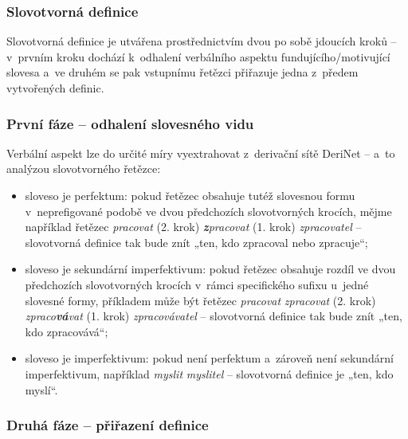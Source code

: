 \hypertarget{slovotvornuxe1-definice}{%
\subsubsection{Slovotvorná definice}\label{slovotvornuxe1-definice}}

Slovotvorná definice je utvářena prostřednictvím dvou po sobě jdoucích
kroků -- v~prvním kroku dochází k~odhalení verbálního aspektu
fundujícího/motivující slovesa a~ve druhém se pak vstupnímu řetězci
přiřazuje jedna z~předem vytvořených definic.

\hypertarget{prvni-faze}{%
\subsubsection*{První fáze -- odhalení slovesného vidu}\label{prvni-faze}}

Verbální aspekt lze do určité míry vyextrahovat z~derivační sítě DeriNet
-- a~to analýzou slovotvorného řetězce:

\begin{itemize}
\tightlist
\item
  sloveso je perfektum: pokud řetězec obsahuje tutéž slovesnou formu
v~neprefigované podobě ve dvou předchozích slovotvorných krocích, mějme
  například řetězec \emph{pracovat} (2. krok) \rightarrow
  \emph{\textbf{z}pracovat} (1. krok) \rightarrow
  \emph{zpracovatel} -- slovotvorná definice tak bude znít „ten, kdo
  zpracoval nebo zpracuje``;
\item
  sloveso je sekundární imperfektivum: pokud řetězec obsahuje rozdíl ve
  dvou předchozích slovotvorných krocích v~rámci specifického sufixu
u~jedné slovesné formy, příkladem může být řetězec \emph{pracovat}
  \rightarrow \emph{zpracovat} (2. krok) \rightarrow
  \emph{zpraco\textbf{vá}vat} (1. krok) \rightarrow
  \emph{zpracovávatel} -- slovotvorná definice tak bude znít „ten, kdo
  zpracovává``;
\item
  sloveso je imperfektivum: pokud není perfektum a~zároveň není
  sekundární imperfektivum, například \emph{myslit} \rightarrow
  \emph{myslitel} -- slovotvorná definice je „ten, kdo myslí``.
 ~\parencite{adri}
\end{itemize}

\hypertarget{druha-faze}{%
\subsubsection*{Druhá fáze -- přiřazení definice}\label{druha-faze}}

